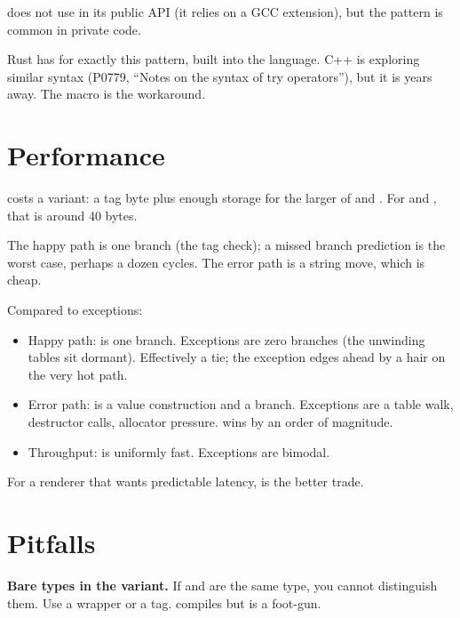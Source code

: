 \maya{} does not use  in its public API (it relies on
a GCC extension), but the pattern is common in private code.

\begin{aside}
Rust has  for exactly this pattern, built into the
language. C++ is exploring similar syntax (P0779, ``Notes on the
syntax of try operators''), but it is years away. The macro is
the workaround.
\end{aside}

\section{Performance}

 costs a variant: a tag byte plus enough
storage for the larger of  and . For  and , that is around 40 bytes.

The happy path is one branch (the tag check); a missed branch
prediction is the worst case, perhaps a dozen cycles. The error
path is a string move, which is cheap.

Compared to exceptions:

\begin{itemize}[leftmargin=*]
  \item Happy path:  is one branch. Exceptions are
    zero branches (the unwinding tables sit dormant).
    Effectively a tie; the exception edges ahead by a hair on
    the very hot path.
  \item Error path:  is a value construction and a
    branch. Exceptions are a table walk, destructor calls,
    allocator pressure.  wins by an order of
    magnitude.
  \item Throughput:  is uniformly fast. Exceptions
    are bimodal.
\end{itemize}

For a renderer that wants predictable latency,  is
the better trade.

\section{Pitfalls}

\begin{warning}
\textbf{Bare types in the variant.} If  and 
are the same type, you cannot distinguish them. Use a wrapper
or a tag.  compiles but is a foot-gun.
\end{warning}

